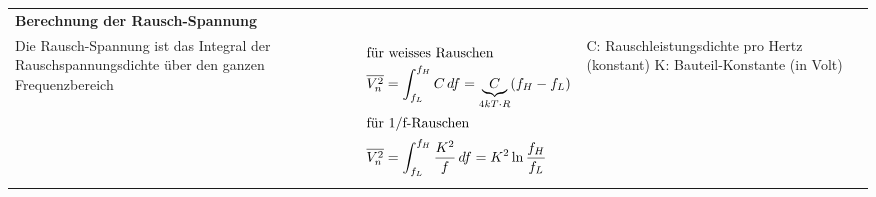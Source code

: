 \vspace{-2.5\topsep}
\begin{longtable}[t]{|p{4cm}|p{5.5cm}|p{7.8cm}|}
    \hline  
    \multicolumn{3}{|l|}{\bf Berechnung der Rausch-Spannung}
    \\ \hdashline
    Die Rausch-Spannung ist das Integral der Rauschspannungsdichte über den ganzen Frequenzbereich
    & {\vspace{-1.5\topsep}
       \begin{align*}
            \intertext{für weisses Rauschen}
            \overline{V_n^2} &= \int_{f_L}^{f_H} C \, df = \underbrace{C}_{4kT\cdot R} (f_H-f_L) \\
            \intertext{für 1/f-Rauschen}
            \overline{V_n^2} &= \int_{f_L}^{f_H} \frac{K^2}{f} \, df = K^2 \ln\frac{f_H}{f_L}
       \end{align*}
      }
    & {C: Rauschleistungsdichte pro Hertz (konstant)\newline
       \newline\newline\newline
       K: Bauteil-Konstante (in Volt)
      }
    \\ \hline
\end{longtable}

